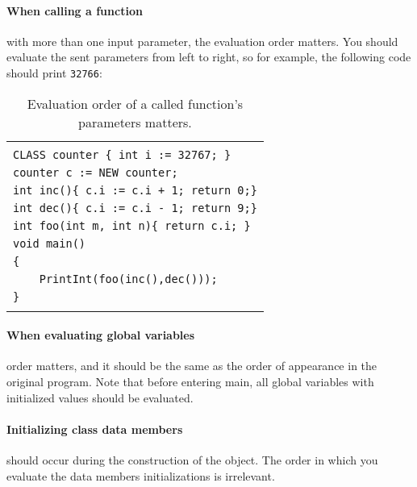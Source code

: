 \documentclass{article}
\begin{document}
\paragraph{When calling a function} with more than one input parameter,
the evaluation order matters. You should evaluate the sent parameters
from left to right, so for example, the following code should print \verb"32766":
\begin{table}[h]
\centering
\begin{tabular}{|l|}
\hline
                                               \\
\verb"CLASS counter { int i := 32767; }"       \\
\verb"counter c := NEW counter;"               \\
\verb"int inc(){ c.i := c.i + 1; return 0;}"   \\
\verb"int dec(){ c.i := c.i - 1; return 9;}"   \\
\verb"int foo(int m, int n){ return c.i; }"    \\
\verb"void main()"                             \\
\verb"{"                                       \\
\verb"    PrintInt(foo(inc(),dec()));"         \\
\verb"}"                                       \\
                                               \\
\hline
\end{tabular}
\caption{Evaluation order of a called function's parameters matters.
\label{Table_Code_Example_Evaluation_Order_Function_Call}}
\end{table}
\paragraph{When evaluating global variables} order matters,
and it should be the same as the order of appearance in the original program.
Note that before entering main, all global variables with initialized values
should be evaluated.
\paragraph{Initializing class data members}
should occur during the construction of the object.
The order in which you evaluate the data members initializations is irrelevant.
\newpage
\end{document}
